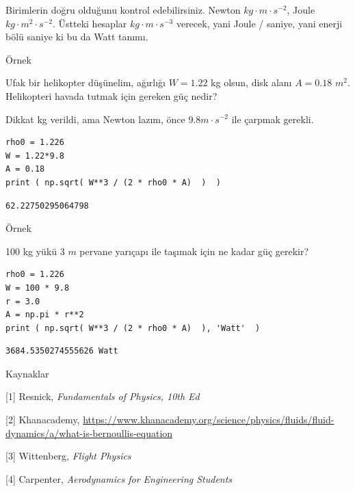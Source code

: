 \documentclass[12pt,fleqn]{article}\usepackage{../../common}
\begin{document}
Birimlerin doğru olduğunu kontrol edebilirsiniz. Newton $kg \cdot m \cdot
s^{-2}$, Joule $kg \cdot m^2 \cdot s^{-2}$. Üstteki hesaplar $kg \cdot m
\cdot s^{-3}$ verecek, yani Joule / saniye, yani enerji bölü saniye ki bu
da Watt tanımı. 

Örnek

Ufak bir helikopter düşünelim, ağırlığı $W = 1.22$ kg olsun, disk alanı
$A = 0.18$ $m^2$. Helikopteri havada tutmak için gereken güç nedir?

Dikkat kg verildi, ama Newton lazım, önce $9.8 m \cdot s^{-2}$ ile çarpmak gerekli.

\begin{verbatim}
rho0 = 1.226
W = 1.22*9.8
A = 0.18
print ( np.sqrt( W**3 / (2 * rho0 * A)  )  )  
\end{verbatim}

\begin{verbatim}
62.22750295064798
\end{verbatim}

Örnek

100 kg yükü 3 $m$ pervane yarıçapı ile taşımak için ne kadar güç gerekir?

\begin{verbatim}
rho0 = 1.226
W = 100 * 9.8
r = 3.0
A = np.pi * r**2
print ( np.sqrt( W**3 / (2 * rho0 * A)  ), 'Watt'  ) 
\end{verbatim}

\begin{verbatim}
3684.5350274555626 Watt
\end{verbatim}

Kaynaklar

[1] Resnick, {\em Fundamentals of Physics, 10th Ed}

[2] Khanacademy, 
    \url{https://www.khanacademy.org/science/physics/fluids/fluid-dynamics/a/what-is-bernoullis-equation}

[3] Wittenberg, {\em Flight Physics}

[4] Carpenter, {\em Aerodynamics for Engineering Students}
\end{document}
